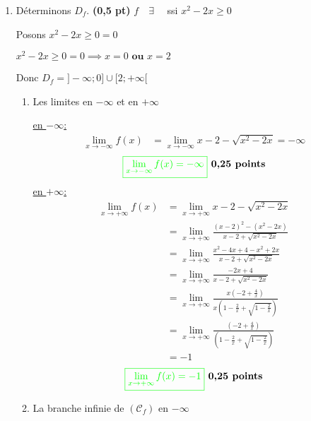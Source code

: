 \documentclass[12pt,a4paper]{article}
\begin{document}
\begin{enumerate}
\item  Déterminons \( D_f \). \hspace{1cm} \textbf{(0,5 pt)}
$ f \quad \exists \quad$ ssi  $x^2 - 2x \geq 0 $

Posons $x^2 - 2x \geq 0 =0$

$x^2 - 2x \geq 0 =0 \implies x=0 \textbf{ ou } x=2$


Donc $D_f=]-\infty ; 0] \cup [2 ; +\infty[ $

\begin{enumerate}
\item Les limites en $-\infty$ et en $+\infty$

\underline{en $-\infty$:}
\begin{align*}
\lim_{x \to -\infty} f(x) &= \lim_{x \to -\infty}x - 2 - \sqrt{x^2 - 2x}=-\infty
\end{align*}
\[
\textcolor{green}{\boxed{ \lim_{x \to -\infty} f(x) = -\infty  }} \textbf{ 0,25 points}
\]
\underline{en $+\infty$:}
\begin{align*}
\lim_{x \to +\infty} f(x) &= \lim_{x \to +\infty}x - 2 - \sqrt{x^2 - 2x}\\
													&= \lim_{x \to +\infty}\frac{(x - 2)^{2} - (x^2 - 2x)}{x - 2 + \sqrt{x^2 - 2x}}\\
													&= \lim_{x \to +\infty}\frac{x^{2}-4x+4 - x^2 + 2x}{x - 2 + \sqrt{x^2 - 2x}}\\
													&= \lim_{x \to +\infty}\frac{-2x+4}{x - 2 + \sqrt{x^2 - 2x}}\\
													&= \lim_{x \to +\infty}\frac{x\left( -2+\frac{4}{x}\right) }{x\left( 1 - \frac{2}{x} + \sqrt{1 - \frac{2}{x}}\right) }\\
													&= \lim_{x \to +\infty}\frac{\left( -2+\frac{4}{x}\right) }{\left( 1 - \frac{2}{x} + \sqrt{1 - \frac{2}{x}}\right) }\\
													&= -1
\end{align*}
\[
\textcolor{green}{\boxed{ \lim_{x \to +\infty} f(x) = -1  }} \textbf{ 0,25 points}
\]
\item La branche infinie de $(\mathcal{C}_{f}) $ en $-\infty$


\end{enumerate}
\end{enumerate}
\end{document}

